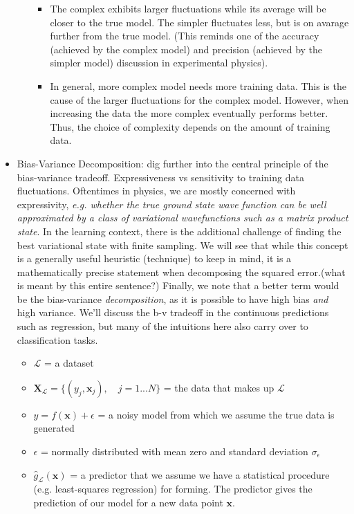 \documentclass[norsk,a4paper,11pt]{article}
\begin{document}
\begin{itemize}
\begin{itemize}
\begin{itemize}
				\item The complex exhibits larger fluctuations while its average will be closer to the true model. The simpler fluctuates less, but is on avarage further from the true model. (This reminds one of the accuracy (achieved by the complex model) and precision (achieved by the simpler model) discussion in experimental physics).
				\item In general, more complex model needs more training data. This is the cause of the larger fluctuations for the complex model. However, when increasing the data the more complex eventually performs better. Thus, the choice of complexity depends on the amount of training data.
			\end{itemize}
		\end{itemize}
		\item Bias-Variance Decomposition: dig further into the central principle of the bias-variance tradeoff. Expressiveness vs sensitivity to training data fluctuations. Oftentimes in physics, we are mostly concerned with expressivity, \textit{e.g. whether the true ground state wave function can be well approximated by a class of variational wavefunctions such as a matrix product state}. In the learning context, there is the additional challenge of finding the best variational state with finite sampling. We will see that while this concept is a generally useful heuristic (technique) to keep in mind, it is a mathematically precise statement when decomposing the squared error.(what is meant by this entire sentence?) Finally, we note that a better term would be the bias-variance \textit{decomposition}, as it is possible to have high bias \textit{and} high variance.
		We'll discuss the b-v tradeoff in the continuous predictions such as regression, but many of the intuitions here also carry over to classification tasks.
		\begin{itemize}
			\item $\mathcal{L}$ = a dataset
			\item $\mathbf{X}_\mathcal{L} = \{ (y_j, \mathbf{x}_j), \quad j=1...N \}$ = the data that makes up $\mathcal{L}$
			\item $y = f(\mathbf{x}) + \epsilon$ = a noisy model from which we assume the true data is generated
			\item $\epsilon$ = normally distributed with mean zero and standard deviation $\sigma_\epsilon$
			\item $\hat{g}_\mathcal{L}(\mathbf{x})$ = a predictor that we assume we have a statistical procedure (e.g. least-squares regression) for forming. The predictor gives the prediction of our model for a new data point $\mathbf{x}$.

\end{itemize}
\end{itemize}
\end{document}
